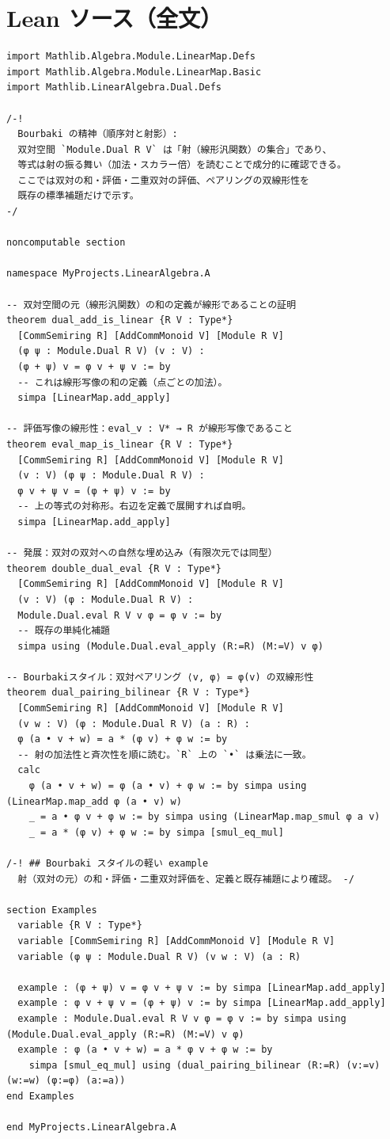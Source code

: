 \documentclass[12pt]{article}
\begin{document}
\section*{Lean ソース（全文）}
\begin{lstlisting}
import Mathlib.Algebra.Module.LinearMap.Defs
import Mathlib.Algebra.Module.LinearMap.Basic
import Mathlib.LinearAlgebra.Dual.Defs

/-!
  Bourbaki の精神（順序対と射影）:
  双対空間 `Module.Dual R V` は「射（線形汎関数）の集合」であり、
  等式は射の振る舞い（加法・スカラー倍）を読むことで成分的に確認できる。
  ここでは双対の和・評価・二重双対の評価、ペアリングの双線形性を
  既存の標準補題だけで示す。
-/

noncomputable section

namespace MyProjects.LinearAlgebra.A

-- 双対空間の元（線形汎関数）の和の定義が線形であることの証明
theorem dual_add_is_linear {R V : Type*}
  [CommSemiring R] [AddCommMonoid V] [Module R V]
  (φ ψ : Module.Dual R V) (v : V) :
  (φ + ψ) v = φ v + ψ v := by
  -- これは線形写像の和の定義（点ごとの加法）。
  simpa [LinearMap.add_apply]

-- 評価写像の線形性：eval_v : V* → R が線形写像であること
theorem eval_map_is_linear {R V : Type*}
  [CommSemiring R] [AddCommMonoid V] [Module R V]
  (v : V) (φ ψ : Module.Dual R V) :
  φ v + ψ v = (φ + ψ) v := by
  -- 上の等式の対称形。右辺を定義で展開すれば自明。
  simpa [LinearMap.add_apply]

-- 発展：双対の双対への自然な埋め込み（有限次元では同型）
theorem double_dual_eval {R V : Type*}
  [CommSemiring R] [AddCommMonoid V] [Module R V]
  (v : V) (φ : Module.Dual R V) :
  Module.Dual.eval R V v φ = φ v := by
  -- 既存の単純化補題
  simpa using (Module.Dual.eval_apply (R:=R) (M:=V) v φ)

-- Bourbakiスタイル：双対ペアリング ⟨v, φ⟩ = φ(v) の双線形性
theorem dual_pairing_bilinear {R V : Type*}
  [CommSemiring R] [AddCommMonoid V] [Module R V]
  (v w : V) (φ : Module.Dual R V) (a : R) :
  φ (a • v + w) = a * (φ v) + φ w := by
  -- 射の加法性と斉次性を順に読む。`R` 上の `•` は乗法に一致。
  calc
    φ (a • v + w) = φ (a • v) + φ w := by simpa using (LinearMap.map_add φ (a • v) w)
    _ = a • φ v + φ w := by simpa using (LinearMap.map_smul φ a v)
    _ = a * (φ v) + φ w := by simpa [smul_eq_mul]

/-! ## Bourbaki スタイルの軽い example
  射（双対の元）の和・評価・二重双対評価を、定義と既存補題により確認。 -/

section Examples
  variable {R V : Type*}
  variable [CommSemiring R] [AddCommMonoid V] [Module R V]
  variable (φ ψ : Module.Dual R V) (v w : V) (a : R)

  example : (φ + ψ) v = φ v + ψ v := by simpa [LinearMap.add_apply]
  example : φ v + ψ v = (φ + ψ) v := by simpa [LinearMap.add_apply]
  example : Module.Dual.eval R V v φ = φ v := by simpa using (Module.Dual.eval_apply (R:=R) (M:=V) v φ)
  example : φ (a • v + w) = a * φ v + φ w := by
    simpa [smul_eq_mul] using (dual_pairing_bilinear (R:=R) (v:=v) (w:=w) (φ:=φ) (a:=a))
end Examples

end MyProjects.LinearAlgebra.A

\end{lstlisting}
\end{document}
